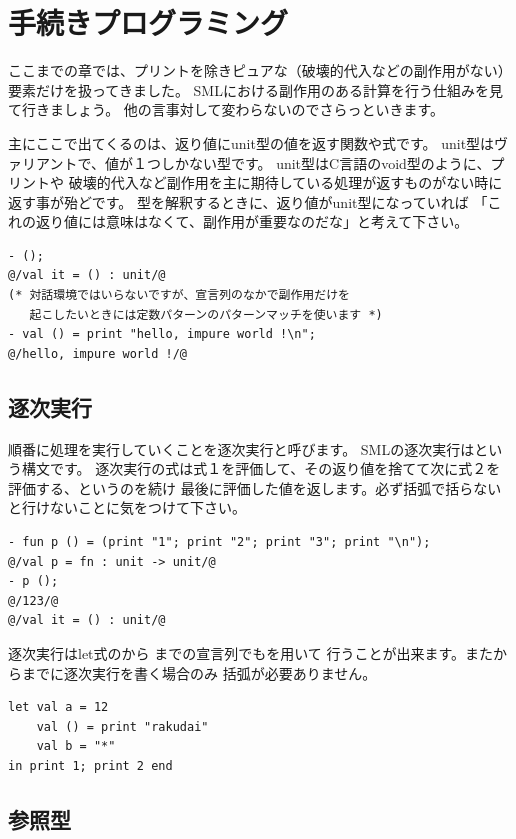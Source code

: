 \documentclass[11pt,a4paper]{jarticle}
\begin{document}
\section{手続きプログラミング}

ここまでの章では、プリントを除きピュアな（破壊的代入などの副作用がない）要素だけを扱ってきました。
SMLにおける副作用のある計算を行う仕組みを見て行きましょう。
他の言事対して変わらないのでさらっといきます。

主にここで出てくるのは、返り値にunit型の値を返す関数や式です。
unit型はヴァリアントで、値が\prog{()}１つしかない型です。
unit型はC言語のvoid型のように、プリントや
破壊的代入など副作用を主に期待している処理が返すものがない時に返す事が殆どです。
型を解釈するときに、返り値がunit型になっていれば
「これの返り値には意味はなくて、副作用が重要なのだな」と考えて下さい。

\begin{lstlisting}
- ();
@/val it = () : unit/@
(* 対話環境ではいらないですが、宣言列のなかで副作用だけを
   起こしたいときには定数パターンのパターンマッチを使います *)
- val () = print "hello, impure world !\n";
@/hello, impure world !/@
\end{lstlisting}

\subsection{逐次実行}

順番に処理を実行していくことを逐次実行と呼びます。
SMLの逐次実行はという構文です。
逐次実行の式は式１を評価して、その返り値を捨てて次に式２を評価する、というのを続け
最後に評価した値を返します。必ず括弧で括らないと行けないことに気をつけて下さい。

\begin{lstlisting}[caption=逐次実行,label=code:sequence]
- fun p () = (print "1"; print "2"; print "3"; print "\n");
@/val p = fn : unit -> unit/@
- p ();
@/123/@
@/val it = () : unit/@
\end{lstlisting}

逐次実行はlet式のから
までの宣言列でもを用いて
行うことが出来ます。またからまでに逐次実行を書く場合のみ
括弧が必要ありません。

\begin{lstlisting}
let val a = 12
    val () = print "rakudai"
    val b = "*"
in print 1; print 2 end
\end{lstlisting}

\subsection{参照型}
\end{document}

